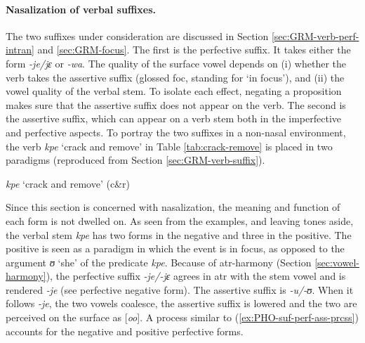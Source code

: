 \paragraph{Nasalization of verbal suffixes.}
\label{sec:nasalization-verb-suffix}

The two suffixes under consideration are discussed in Section
\ref{sec:GRM-verb-perf-intran}
and \ref{sec:GRM-focus}.  The first is  the perfective suffix.  It takes
either the form {\it -je/jɛ} or {\it -wa}.
The quality of the surface vowel depends on (i) whether the verb takes the
assertive suffix (glossed {\sc foc}, standing for `in focus'),  and (ii) the
vowel quality of the verbal stem. To isolate each effect, negating a proposition
makes sure that the assertive suffix does not appear on the verb. The second is
the assertive suffix, which can appear on a verb stem both in the imperfective
and perfective aspects.  To portray the two suffixes in a non-nasal environment,
 the verb {\it kpe} `crack and remove' in Table \ref{tab:crack-remove}  is 
placed in two paradigms (reproduced from Section \ref{sec:GRM-verb-suffix}). 



\begin{table}[!htb]
\small
\centering
\caption{{\it kpe} {\rm `crack
and remove'} (c\&r)  \label{tab:crack-remove}}

\quad
{}
\end{table}


Since this section is concerned with nasalization, the
meaning and
function of each form is not dwelled on. As
seen from the examples, and leaving tones aside, the
verbal stem {\it kpe} has two forms in the negative and three in the positive.
The positive is seen as a paradigm in which the event is in focus, as opposed
to the argument {\it ʊ} `she' of the predicate {\it kpe}. Because of
{\sc atr}-harmony (Section \ref{sec:vowel-harmony}), the
perfective suffix {\it -je/-jɛ} agrees in {\sc atr} with the stem vowel and is 
rendered {\it -je} (see perfective negative form).
The assertive suffix is {\it -u/-ʊ}. When it follows {\it  
 -je}, the two vowels coalesce, the assertive suffix is lowered and the two are
perceived on the surface as [{\it oo}]. A process similar to 
(\ref{ex:PHO-suf-perf-ass-prcss})  accounts for the negative and
positive 
perfective forms.

